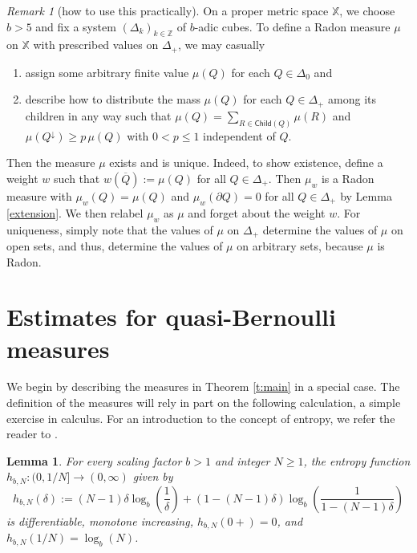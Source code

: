 \documentclass[12pt]{amsart}
\newtheorem{lemma}[theorem]{Lemma}
\theoremstyle{definition}
\theoremstyle{remark}
\newtheorem{remark}[theorem]{Remark}
\newcommand{\ZZ}{\mathbb{Z}}
\newcommand{\XX}{\mathbb{X}}
\newcommand{\Child}{\mathsf{Child}}
\numberwithin{figure}{section}
\numberwithin{equation}{section}
\begin{document}
\begin{remark}[how to use this practically] \label{practical} On a proper metric space $\XX$, we choose $b>5$ and fix a system  $(\Delta_k)_{k\in\ZZ}$ of $b$-adic cubes. To define a Radon measure $\mu$ on $\XX$ with prescribed values on $\Delta_+$, we may casually \begin{enumerate}
\item assign some arbitrary finite value $\mu(Q)$ for each $Q\in\Delta_0$ and
\item describe how to distribute the mass $\mu(Q)$ for each $Q\in\Delta_+$ among its children in any way such that $\mu(Q)=\sum_{R\in\Child(Q)}\mu(R)$ and $\mu(Q^\downarrow)\geq p\,\mu(Q)$ with $0<p\leq 1$ independent of $Q$.
\end{enumerate} Then the measure $\mu$ exists and is unique. Indeed, to show existence, define a weight $w$ such that $w(\overline{Q}):=\mu(Q)$ for all $Q\in\Delta_+$. Then $\mu_w$ is a Radon measure with $\mu_w(Q)=\mu(Q)$ and $\mu_w(\partial Q)=0$ for all $Q\in\Delta_+$ by Lemma \ref{extension}. We then relabel $\mu_w$ as $\mu$ and forget about the weight $w$. For uniqueness, simply note that the values of $\mu$ on $\Delta_+$ determine the values of $\mu$ on open sets, and thus, determine the values of $\mu$ on arbitrary sets, because $\mu$ is Radon.\end{remark}

\section{Estimates for quasi-Bernoulli measures}\label{s:bernoulli}

We begin by describing the measures in Theorem \ref{t:main} in a special case. The definition of the measures will rely in part on the following calculation, a simple exercise in calculus. For an introduction to the concept of entropy, we refer the reader to \cite{Cover-Thomas}.

\begin{lemma}\label{entropy-1} For every scaling factor $b>1$ and integer $N\geq 1$, the entropy function $h_{b,N}:(0,1/N]\rightarrow (0,\infty)$ given by \begin{equation} h_{b,N}(\delta):=(N-1)\delta\log_b\left(\frac{1}{\delta}\right)+(1-(N-1)\delta)\log_b\left(\frac{1}{1-(N-1)\delta}\right)\end{equation} is differentiable, monotone increasing, $h_{b,N}(0+)=0$, and $h_{b,N}(1/N)=\log_b(N)$.\end{lemma}
\end{document}
